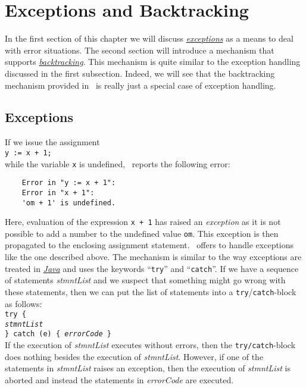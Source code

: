\chapter{Exceptions and Backtracking}
In the first section of this chapter we will discuss
\href{https://en.wikipedia.org/wiki/Exception_handling}{\emph{exceptions}} as a means to deal with
error situations.  The second section will introduce a mechanism that supports
\href{https://en.wikipedia.org/wiki/Backtracking}{\emph{backtracking}}.  This mechanism is quite
similar to the exception handling discussed in the first subsection.  Indeed, we will see that the
backtracking mechanism provided in \setlx\ is really just a special case of exception handling.

\section{Exceptions}
If we issue the assignment
\\[0.2cm]
\hspace*{1.3cm}
\texttt{y := x + 1;}
\\[0.2cm]
while the variable \texttt{x} is undefined, \setlx\ reports the following error:
\begin{verbatim}
    Error in "y := x + 1":
    Error in "x + 1":
    'om + 1' is undefined.
\end{verbatim}
Here, evaluation of the expression \texttt{x + 1} has raised an \emph{exception} 
as it is not possible to add a number to the undefined value \texttt{om}.  This exception is then
propagated to the enclosing assignment statement. \setlx\ offers to handle exceptions like the
one described above.  The mechanism is similar to the way exceptions
are treated in 
\href{http://docs.oracle.com/javase/tutorial/essential/exceptions/}{\textsl{Java}} and uses the keywords
``\texttt{try}'' and ``\texttt{catch}''.   If we have a sequence of statements
\textsl{stmntList} and we suspect that 
something might go wrong with these statements, then we can put the list of statements into a
\texttt{try}/\texttt{catch}-block as follows:
\\[0.2cm]
\hspace*{1.3cm}
\texttt{try \{}
\\
\hspace*{1.8cm}
\texttt{\textsl{stmntList}}
\\
\hspace*{1.3cm}
\texttt{\} catch (e) \{ \textsl{errorCode} \}}
\\[0.2cm]
If the execution of \textsl{stmntList} executes without errors, then the
\texttt{try/catch}-block does nothing besides the execution of \textsl{stmntList}.  However, if
one of the statements in \textsl{stmntList} raises an exception, then the execution of 
\textsl{stmntList} is aborted and instead the statements in \textsl{errorCode} are executed.

